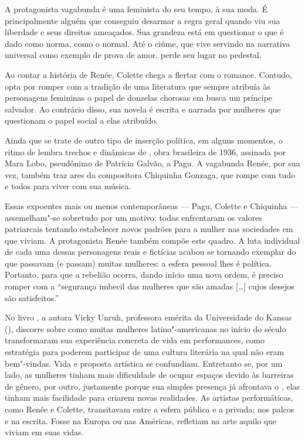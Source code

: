 \begin{multicols}{2}
A protagonista vagabunda é uma feminista do seu tempo, à sua moda. É principalmente alguém que conseguiu desarmar a regra geral quando viu sua liberdade e seus direitos ameaçados. Sua grandeza está em questionar o que é dado como norma, como o normal. Até o ciúme, que vive servindo na narrativa universal como exemplo de prova de amor, perde seu lugar no pedestal. 

Ao contar a história de Renée, Colette chega a flertar com o romance. Contudo, opta por romper com a tradição de uma literatura que sempre atribuía às personagens femininas o papel de donzelas chorosas em busca um príncipe salvador. Ao contrário disso, sua novela é escrita e narrada por mulheres que questionam o papel social a elas atribuído.

Ainda que se trate de outro tipo de inserção política, em alguns momentos, o ritmo de {} lembra trechos e dinâmicas de {}, obra brasileira de 1936, assinada por Mara Lobo, pseudônimo de Patrícia Galvão, a Pagu. A vagabunda Renée, por sua vez, também traz ares da compositora Chiquinha Gonzaga, que rompe com tudo e todos para viver com sua música.

Essas expoentes mais ou menos contemporâneas --- Pagu, Colette e Chiquinha --- assemelham"-se sobretudo por um motivo: todas enfrentaram os valores patriarcais tentando estabelecer novos padrões para a mulher nas sociedades em que viviam. A protagonista Renée também compõe este quadro. A luta individual de cada uma dessas personagens reais e fictícias acabou se tornando exemplar do que passavam (e passam) muitas mulheres: a esfera pessoal lhes é política. Portanto, para que a rebelião ocorra, dando início uma nova ordem, é preciso romper com a “segurança imbecil das mulheres que são amadas [\ldots{}] cujos desejos são satisfeitos.”

No livro {}, a autora Vicky Unruh, professora emérita da Universidade do Kansas (), discorre sobre como muitas mulheres latino"-americanas no início do século  transformaram sua experiência concreta de vida em performances, como estratégia para poderem participar de uma cultura literária na qual não eram bem"-vindas. Vida e proposta artística se confundiam. Entretanto se, por um lado, as mulheres tinham mais dificuldade de ocupar espaços devido às barreiras de gênero, por outro, justamente porque sua simples presença já afrontava o {}, elas tinham mais facilidade para criarem novas realidades. As artistas performáticas, como Renée e Colette, transitavam entre a esfera pública e a privada; nos palcos e na escrita. Fosse na Europa ou nas Américas, refletiam na arte aquilo que viviam em suas vidas.


\end{multicols}
